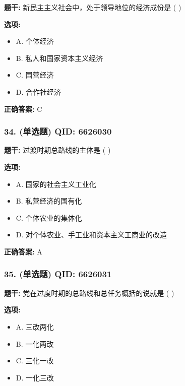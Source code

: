 \documentclass[12pt,UTF8]{ctexart}
\begin{document}
\textbf{题干:}
新民主主义社会中，处于领导地位的经济成份是  ( )

\textbf{选项:}
\begin{itemize}[leftmargin=*]

  \item A. 个体经济

  \item B. 私人和国家资本主义经济

  \item C. 国营经济

  \item D. 合作社经济

\end{itemize}

\textbf{正确答案:}
C

\vspace{0.3em}\hrulefill\vspace{0.7em}

\subsubsection*{34. (单选题) \small QID: 6626030}

\textbf{题干:}
过渡时期总路线的主体是  ( )

\textbf{选项:}
\begin{itemize}[leftmargin=*]

  \item A. 国家的社会主义工业化

  \item B. 私营经济的国有化

  \item C. 个体农业的集体化

  \item D. 对个体农业、手工业和资本主义工商业的改造

\end{itemize}

\textbf{正确答案:}
A

\vspace{0.3em}\hrulefill\vspace{0.7em}

\subsubsection*{35. (单选题) \small QID: 6626031}

\textbf{题干:}
党在过度时期的总路线和总任务概括的说就是  ( )

\textbf{选项:}
\begin{itemize}[leftmargin=*]

  \item A. 三改两化

  \item B. 一化两改

  \item C. 三化一改

  \item D. 一化三改

\end{itemize}
\end{document}
